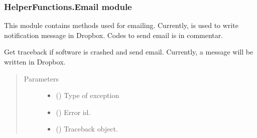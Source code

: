 \documentclass[letterpaper,10pt,english]{sphinxmanual}
\begin{document}
\begin{DUlineblock}{0em}
\item[] 
\end{DUlineblock}


\subsubsection{HelperFunctions.Email module}
\label{\detokenize{NoSeMazeController/HelperFunctions:module-HelperFunctions.Email}}\label{\detokenize{NoSeMazeController/HelperFunctions:helperfunctions-email-module}}
\sphinxAtStartPar
This module contains methods used for e\sphinxhyphen{}mailing. Currently, is used to write
notification message in Dropbox. Codes to send e\sphinxhyphen{}mail is in commentar.

\begin{fulllineitems}
\label{\detokenize{NoSeMazeController/HelperFunctions:HelperFunctions.Email.crash_error}}
\pysigstartsignatures
{}
\pysigstopsignatures
\sphinxAtStartPar
Get traceback if software is crashed and send e\sphinxhyphen{}mail. Currently, a message
will be written in Dropbox.
\begin{quote}\begin{description}
\item[{Parameters}] \leavevmode\begin{itemize}
\item {} 
\sphinxAtStartPar
{} () \textendash{} Type of exception

\item {} 
\sphinxAtStartPar
{} () \textendash{} Error id.

\item {} 
\sphinxAtStartPar
{} () \textendash{} Traceback object.

\end{itemize}

\end{description}\end{quote}

\end{fulllineitems}
\end{document}
